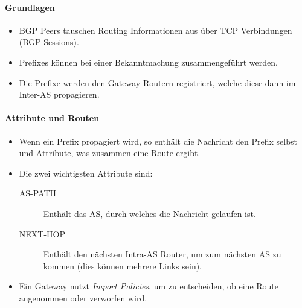 \documentclass[a4paper, 11pt, accentcolor = tud3b]{tudreport}
\begin{document}
                \paragraph{Grundlagen}
	                \begin{itemize}
	                	\item BGP Peers tauschen Routing Informationen aus über TCP Verbindungen (BGP Sessions).
	                	\item Prefixes können bei einer Bekanntmachung zusammengeführt werden.
	                	\item Die Prefixe werden den Gateway Routern registriert, welche diese dann im Inter-AS propagieren.
	                \end{itemize}
                
                \paragraph{Attribute und Routen}
	                \begin{itemize}
	                	\item Wenn ein Prefix propagiert wird, so enthält die Nachricht den Prefix selbst und Attribute, was zusammen eine Route ergibt.
	                	\item Die zwei wichtigsten Attribute sind:
		                	\begin{description}
		                		\item[AS-PATH] Enthält das AS, durch welches die Nachricht gelaufen ist.
		                		\item[NEXT-HOP] Enthält den nächsten Intra-AS Router, um zum nächsten AS zu kommen (dies können mehrere Links sein).
		                	\end{description}
		                \item Ein Gateway nutzt \textit{Import Policies}, um zu entscheiden, ob eine Route angenommen oder verworfen wird.
	                \end{itemize}
\end{document}
